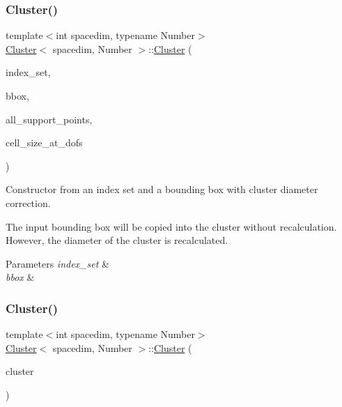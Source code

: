 \subsubsection{\texorpdfstring{Cluster()}{Cluster()}\hspace{0.1cm}{\footnotesize\ttfamily [6/7]}}
{\footnotesize\ttfamily template$<$int spacedim, typename Number$>$ \\
\hyperlink{classCluster}{Cluster}$<$ spacedim, Number $>$\+::\hyperlink{classCluster}{Cluster} (\begin{DoxyParamCaption}\item[{const std\+::vector$<$ types\+::global\+\_\+dof\+\_\+index $>$ \&}]{index\+\_\+set,  }\item[{const \hyperlink{classSimpleBoundingBox}{Simple\+Bounding\+Box}$<$ spacedim, Number $>$ \&}]{bbox,  }\item[{const std\+::vector$<$ Point$<$ spacedim, Number $>$$>$ \&}]{all\+\_\+support\+\_\+points,  }\item[{const std\+::vector$<$ Number $>$ \&}]{cell\+\_\+size\+\_\+at\+\_\+dofs }\end{DoxyParamCaption})}

Constructor from an index set and a bounding box with cluster diameter correction.

The input bounding box will be copied into the cluster without recalculation. However, the diameter of the cluster is recalculated. 
\begin{DoxyParams}{Parameters}
{\em index\+\_\+set} & \\
\hline
{\em bbox} & \\
\hline
\end{DoxyParams}
\mbox{\label{classCluster_a27a372b05916f136ff9fe3e5a92a4362}} 
\subsubsection{\texorpdfstring{Cluster()}{Cluster()}\hspace{0.1cm}{\footnotesize\ttfamily [7/7]}}
{\footnotesize\ttfamily template$<$int spacedim, typename Number$>$ \\
\hyperlink{classCluster}{Cluster}$<$ spacedim, Number $>$\+::\hyperlink{classCluster}{Cluster} (\begin{DoxyParamCaption}\item[{const \hyperlink{classCluster}{Cluster}$<$ spacedim, Number $>$ \&}]{cluster }\end{DoxyParamCaption})}

